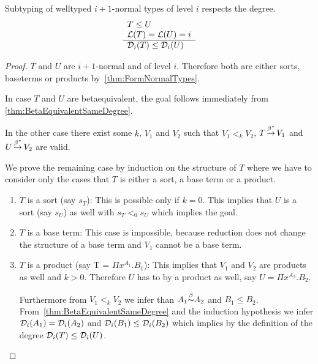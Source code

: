 \begin{theorem}
    Subtyping of welltyped $i+1$-normal types of level $i$ respects the degree.
    \label{thm:SubtypeRespectsDegree}
    $$
    \begin{array}{l} 
        T \le U
        \\
        {\cal L}(T) = {\cal L}(U) = i
     \\ \hline 
        {\cal D}_i(T) \le {\cal D}_i(U)
    \end{array}
    $$
    \begin{proof}
        $T$ and $U$ are $i+1$-normal and of level $i$. Therefore both are either
        sorts, baseterms or products by~\ref{thm:FormNormalTypes}.

        In case $T$ and $U$ are betaequivalent, the goal follows immediately
        from \ref{thm:BetaEquivalentSameDegree}.

        In the other case there exist some $k$, $V_1$ and $V_2$ such that $V_1
        <_k V_2$, $T {\,\stackrel{\beta^*}{\to}\,} V_1$ and $U {\,\stackrel{\beta^*}{\to}\,} V_2$ are valid.

        We prove the remaining case by induction on the structure of $T$ where
        we have to consider only the cases that $T$ is either a sort, a base
        term or a product.

        \begin{enumerate}
            \item $T$ is a sort (say $s_T$): This is possible only if $k=0$. This
                implies that $U$ is a sort (say $s_U$) as well with $s_T <_0
                s_U$ which implies the goal. 

            \item $T$ is a base term: This case is impossible, because reduction
                does not change the structure of a base term and $V_1$
                cannot be a base term.

            \item $T$ is a product (say T = $\Pi x^{A_1}. B_1$): This implies that
                $V_1$ and $V_2$ are products as well and $k > 0$. Therefore $U$ has
                to by a product as well, say $U = \Pi x^{A_2}. B_2$.

                Furthermore from $V_1 <_k V_2$ we infer than $A_1 {\stackrel{\beta}{\sim}} A_2$
                and $B_1 \le B_2$. From~\ref{thm:BetaEquivalentSameDegree} and
                the induction hypothesis we infer ${\cal D}_i(A_1) =
                {\cal D}_i(A_2)$ and ${\cal D}_i(B_1) \le {\cal D}_i(B_2)$ which
                implies by the definition of the degree ${\cal D}_i(T) \le
                {\cal D}_i(U)$.
        \end{enumerate}
    \end{proof}
\end{theorem}



